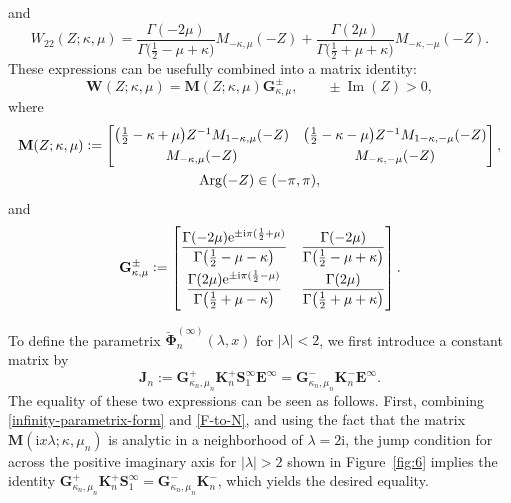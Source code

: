 \documentclass[11pt]{article}
\numberwithin{equation}{section}
\numberwithin{equation}{section}
\newcommand{\ee}{\mathrm{e}}
\newcommand{\ii}{\mathrm{i}}
\newcommand{\para}[1]{\breve{#1}}
\newcommand{\im}{\operatorname{Im}}
\renewcommand{\arg}{\operatorname{Arg}}
\begin{document}
and
\begin{equation*}
 W_{22}(Z;\kappa,\mu)=\frac{\Gamma(-2\mu)}{\Gamma\big(\frac{1}{2}-\mu+\kappa\big)}M_{-\kappa,\mu}(-Z) +\frac{\Gamma(2\mu)}{\Gamma\big(\frac{1}{2}+\mu+\kappa\big)}M_{-\kappa,-\mu}(-Z).
\end{equation*}
These expressions can be usefully combined into a matrix identity:
\begin{equation}
 \mathbf{W}(Z;\kappa,\mu)=\mathbf{M}(Z;\kappa,\mu)\mathbf{G}^\pm_{\kappa,\mu},\qquad \pm\im(Z)>0,
 \label{F-to-N}
\end{equation}
where
\begin{gather}
 \mathbf{M}(Z;\kappa,\mu):=
 \begin{bmatrix}
 \big(\frac{1}{2}-\kappa+\mu\big)Z^{-1}M_{1-\kappa,\mu}(-Z) & \big(\frac{1}{2}-\kappa-\mu\big)Z^{-1}M_{1-\kappa,-\mu}(-Z)\vspace{1mm}\\
 M_{-\kappa,\mu}(-Z) & M_{-\kappa,-\mu}(-Z)
 \end{bmatrix},\nonumber\\
 \arg(-Z)\in (-\pi,\pi),
 \label{N-define}
\end{gather}
and
\begin{equation*} %
 \mathbf{G}^\pm_{\kappa,\mu}:=\begin{bmatrix}
 \displaystyle \frac{\Gamma(-2\mu)\ee^{\pm \ii\pi(\frac{1}{2}+\mu)}}{\Gamma\big(\frac{1}{2}-\mu-\kappa\big)} &
 \displaystyle \frac{\Gamma(-2\mu)}{\Gamma\big(\frac{1}{2}-\mu+\kappa\big)}\vspace{1mm}\\
 \displaystyle\frac{\Gamma(2\mu)\ee^{\pm \ii\pi(\frac{1}{2}-\mu)}}{\Gamma\big(\frac{1}{2}+\mu-\kappa\big)} &
 \displaystyle \frac{\Gamma(2\mu)}{\Gamma\big(\frac{1}{2}+\mu+\kappa\big)}
 \end{bmatrix}.
\end{equation*}

To define the parametrix $\para{\boldsymbol{\Phi}}_n^{(\infty)}(\lambda,x)$ for $|\lambda|<2$, we first introduce a constant matrix by
\begin{equation}
 \mathbf{J}_n:=\mathbf{G}_{\kappa_n,\mu_n}^+ \mathbf{K}_n^+ \mathbf{S}_1^{\infty} \mathbf{E}^{\infty}=\mathbf{G}_{\kappa_n,\mu_n}^- \mathbf{K}_n^- \mathbf{E}^{\infty}.
\label{eq:M-infty}
\end{equation}
The equality of these two expressions can be seen as follows. First, combining \eqref{infinity-parametrix-form} and \eqref{F-to-N}, and using the fact that the matrix $\mathbf{M}(\ii x\lambda;\kappa,\mu_n)$ is analytic in a neighborhood of $\lambda=2\ii$, the jump condition for \smash{$\para{\mathbf{\Phi}}_n^{(\infty)}(\lambda,x)$} across the positive imaginary axis for $|\lambda|>2$ shown in Figure~\ref{fig:6} implies the identity $\mathbf{G}_{\kappa_n,\mu_n}^+\mathbf{K}_n^+ \mathbf{S}_1^{\infty}=\mathbf{G}_{\kappa_n,\mu_n}^-\mathbf{K}_n^-$, which yields the desired equality.
\end{document}
